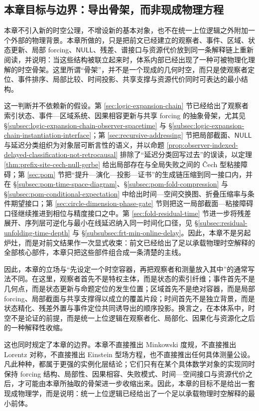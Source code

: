 \subsection{本章目标与边界：导出骨架，而非现成物理方程}\label{subsec:physical-spacetime-skeleton-goal-boundary}

本章不引入新的时空公理，不增设新的基本对象，也不在统一上位逻辑之外附加一个外部的物理背景。本章所做的，只是把前文已经建立的观察者、事件、区域、状态更新、局部 forcing、\(\mathsf{NULL}\)、残差、谱接口与资源代价放到同一条解释链上重新阅读，并说明：当这些结构被联立起来时，体系内部已经出现了一种可被物理化理解的时空骨架。这里所谓“骨架”，并不是一个现成的几何时空，而只是使观察者定位、事件排序、局部比较、时间投影、共享支撑与资源代价同时可表达的最小结构。

这一判断并不依赖新的假设。第 \ref{sec:logic-expansion-chain} 节已经给出了观察者索引状态、事件—区域系统、因果相容更新与共享 forcing 的抽象骨架，尤其见 \S\ref{subsec:logic-expansion-chain-observer-spacetime} 与 \S\ref{subsec:logic-expansion-chain-instantiation-interface}；第 \ref{sec:recursive-addressing} 节把局部截面、\(\mathsf{NULL}\) 与延迟分类组织为对象层可断言性的语义，并以命题 \ref{prop:observer-indexed-delayed-classification-not-retrocausal} 排除了“延迟分类回写过去”的误读，以定理 \ref{thm:prefix-site-cech-null-gerbe} 给出局部存在与全局失败之间的 \v{C}ech 型粘接障碍；第 \ref{sec:pom} 节把“提升—演化—投影—证书”的生成链压缩到同一接口内，并在 \S\ref{subsec:pom-time-space-diagram}、\S\ref{subsec:pom-fold-compression} 与 \S\ref{subsec:pom-conditional-expectation} 中给出时间—空间交换图、折叠压缩率与条件期望接口；第 \ref{sec:circle-dimension-phase-gate} 节则把这一局部截面—粘接障碍口径继续推进到相位与精度接口之中。第 \ref{sec:fold-residual-time} 节进一步将残差展开、序列层可逆化与最小在线延迟纳入同一时间化口径，见 \S\ref{subsec:residual-unfolding-time-depth} 与 \S\ref{subsubsec:frt-min-online-delay}。因此，本章不是另起炉灶，而是对前文结果作一次显式收束：前文已经给出了足以承载物理时空解释的全部核心部件，本章只把这些部件组合成一条清楚的主线。

因此，本章的立场与“先设定一个时空容器，再把观察者和测量放入其中”的通常写法不同。在这里，观察者首先不是特权主体，而是状态的索引纤维；事件首先不是几何点，而是状态更新与命题定位的发生位置；区域首先不是绝对容器，而是局部 forcing、局部截面与共享支撑得以成立的覆盖片段；时间首先不是独立背景，而是状态精化、残差外置与事件定位共同诱导出的顺序投影。换言之，在本体系中，时空不是论证的前提，而是统一上位逻辑在观察者化、局部化、因果化与资源化之后的一种解释性收缩。

这也同时规定了本章的边界。本章不直接推出 Minkowski 度规，不直接推出 Lorentz 对称，不直接推出 Einstein 型场方程，也不直接推出任何具体测量公设。凡此种种，都属于更强的实例化层结论；它们只有在某个具体数学对象的实现同时保持 forcing 结构、局部性、因果相容、失败模式、时间—空间接口与资源代价之后，才可能由本章所抽取的骨架进一步收缩出来。因此，本章的目标不是给出一套现成物理学，而是说明：统一上位逻辑已经给出了一个足以承载物理时空解释的最小前体。

